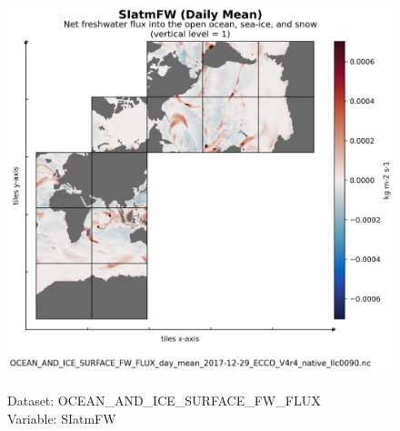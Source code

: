 \begin{figure}[H]
\centering
\includegraphics[scale=0.5]{../images/plots/native_plots/Ocean_and_Sea-Ice_Surface_Freshwater_Fluxes/SIatmFW.png}
\caption{\\Dataset: OCEAN\_AND\_ICE\_SURFACE\_FW\_FLUX\\Variable: SIatmFW}
\label{tab:table-OCEAN_AND_ICE_SURFACE_FW_FLUX_SIatmFW-Plot}
\end{figure}
\pagebreak
